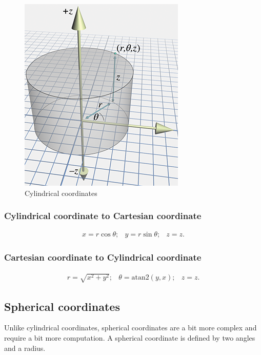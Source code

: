 \documentclass[a4paper,11pt]{article}
\begin{document}
\begin{figure}[H]
\centering
    \includegraphics{07_cylindrical_coordinates}
\caption{Cylindrical coordinates}
\label{fig:cylindrical-coordinates}
\end{figure}

\subsubsection{Cylindrical coordinate to Cartesian coordinate}

$$
\begin{array}{lcr}
x=r\cos\theta; & y=r\sin\theta; & z=z.
\end{array}
$$

\subsubsection{Cartesian coordinate to Cylindrical coordinate}

$$
\begin{array}{lcr}
r=\sqrt{x^2+y^2}; & \theta=\text{atan2}(y,x); & z=z.
\end{array}
$$

\subsection{Spherical coordinates}

Unlike cylindrical coordinates, spherical coordinates are a bit more complex and require a bit more computation. A spherical coordinate is defined by two angles and a radius.
\end{document}
